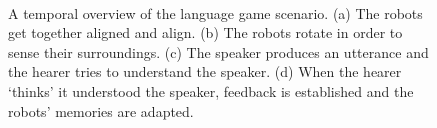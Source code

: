 \begin{figure}
\centering
{}
\\
\caption{A temporal overview of the language game scenario. (a) The robots get together aligned and align. (b) The robots rotate in order to sense their surroundings. (c) The speaker produces an utterance and the hearer tries to understand the speaker. (d) When the hearer `thinks' it understood the speaker, feedback is established and the robots' memories are adapted.}
\label{f:scheme}
\end{figure}




